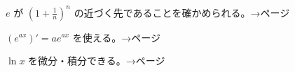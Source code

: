 \begin{furikaeri}
\begin{checklist}
\item $e$ が $(1+\frac{1}{n})^n$ の近づく先であることを確かめられる。\hfill{\footnotesize\sffamily\color{bkTheme}→\pageref{bk:5-14:n}ページ}
\item $(e^{ax})'=ae^{ax}$ を使える。\hfill{\footnotesize\sffamily\color{bkTheme}→\pageref{bk:5-14:eax}ページ}
\item $\ln x$ を微分・積分できる。\hfill{\footnotesize\sffamily\color{bkTheme}→\pageref{bk:5-14:lnbibun}ページ}
\end{checklist}
\end{furikaeri}

